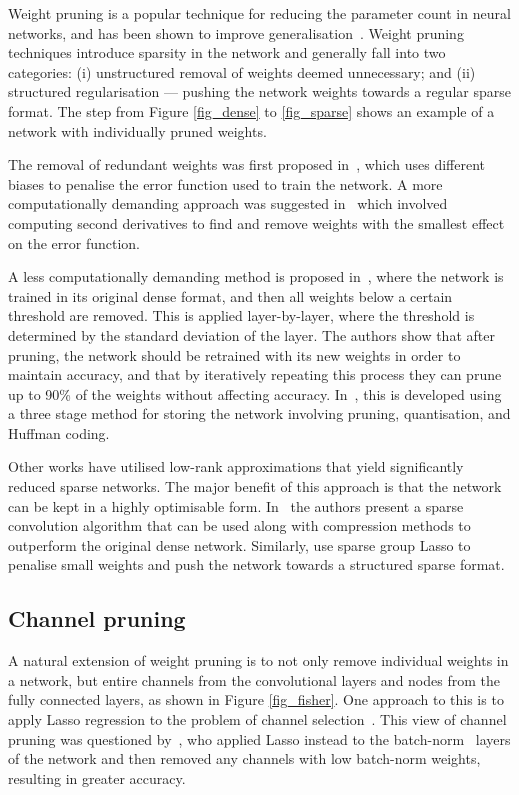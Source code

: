 \documentclass[conference]{IEEEtran}
\begin{document}
Weight pruning is a popular technique for reducing the parameter count in neural networks, and has been shown to improve generalisation~\cite{scardapane2017group}. Weight pruning techniques introduce sparsity in the network and generally fall into two categories: (i) unstructured removal of weights deemed unnecessary; and (ii) structured regularisation --- pushing the network weights towards a regular sparse format. The step from Figure \ref{fig_dense} to \ref{fig_sparse} shows an example of a network with individually pruned weights. 

The removal of redundant weights was first proposed in~\cite{NIPS1988_156}, which uses different biases to penalise the error function used to train the network. A more computationally demanding approach was suggested in~\cite{lecun1990optimal} which involved computing second derivatives to find and remove weights with the smallest effect on the error function.  

A less computationally demanding method is proposed in~\cite{han2015learning}, where the network is trained in its original dense format, and then all weights below a certain threshold are removed. This is applied layer-by-layer, where the threshold is determined by the standard deviation of the layer. The authors show that after pruning, the network should be retrained with its new weights in order to maintain accuracy, and that by iteratively repeating this process they can prune up to 90\% of the weights without affecting accuracy. In~\cite{han2015deep}, this is developed using a three stage method for storing the network involving pruning, quantisation, and Huffman coding.

Other works \cite{liu2015sparse,denil2013predicting} have utilised low-rank approximations that yield significantly reduced sparse networks. The major benefit of this approach is that the network can be kept in a highly optimisable form. In~\cite{liu2015sparse} the authors present a sparse convolution algorithm that can be used along with compression methods to outperform the original dense network. Similarly, \cite{scardapane2017group,wen2016learning} use sparse group Lasso to penalise small weights and push the network towards a structured sparse format. 

\subsection{Channel pruning}A natural extension of weight pruning is to not only remove individual weights in a network, but entire channels from the convolutional layers and nodes from the fully connected layers, as shown in Figure \ref{fig_fisher}. One approach to this is to apply Lasso regression to the problem of channel selection~\cite{he2017channel}. This view of channel pruning was questioned by~\cite{ye2018rethinking}, who applied Lasso instead to the batch-norm~\cite{ioffe2015batch} layers of the network and then removed any channels with low batch-norm weights, resulting in greater accuracy. 
\end{document}
